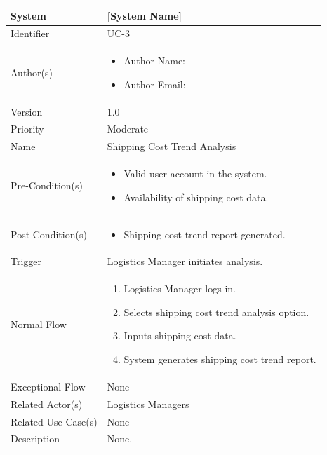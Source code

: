 \begin{center}
	\begin{tabularx}{\textwidth}{|l|X|}
		\hline
		System & [System Name] \\
		\hline
		Identifier & UC-3 \\
		\hline
		Author(s) & \begin{itemize}[left=0pt]
			\item Author Name:
			\item Author Email:
		\end{itemize} \\
		\hline
		Version & 1.0 \\
		\hline
		Priority & Moderate \\
		\hline
		Name & Shipping Cost Trend Analysis \\
		\hline
		Pre-Condition(s) &  \begin{itemize}[left=0pt]
			\item Valid user account in the system.
			\item Availability of shipping cost data.
		\end{itemize} \\
		\hline
		Post-Condition(s) & \begin{itemize}[left=0pt]
			\item Shipping cost trend report generated.
		\end{itemize} \\
		\hline
		Trigger & Logistics Manager initiates analysis. \\
		\hline
		Normal Flow & \begin{enumerate}[left=0pt]
			\item Logistics Manager logs in.
			\item Selects shipping cost trend analysis option.
			\item Inputs shipping cost data.
			\item System generates shipping cost trend report.
		\end{enumerate} \\
		\hline
		Exceptional Flow & None \\
		\hline
		Related Actor(s) & Logistics Managers \\
		\hline
		Related Use Case(s) & None \\
		\hline
		Description & None. \\
		\hline
	\end{tabularx}
\end{center}

